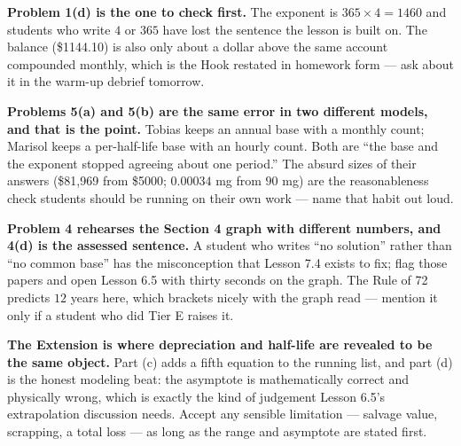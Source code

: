 \documentclass[10pt]{article}
\begin{document}
\begin{teachernote}
\textbf{Problem 1(d) is the one to check first.} The exponent is $365\times4=1460$ and students who
write $4$ or $365$ have lost the sentence the lesson is built on. The balance (\$1144.10) is also only
about a dollar above the same account compounded monthly, which is the Hook restated in homework form
--- ask about it in the warm-up debrief tomorrow.

\textbf{Problems 5(a) and 5(b) are the same error in two different models, and that is the point.}
Tobias keeps an annual base with a monthly count; Marisol keeps a per-half-life base with an hourly
count. Both are ``the base and the exponent stopped agreeing about one period.'' The absurd sizes of
their answers (\$81{,}969 from \$5000; $0.00034$ mg from $90$ mg) are the reasonableness check students
should be running on their own work --- name that habit out loud.

\textbf{Problem 4 rehearses the Section 4 graph with different numbers, and 4(d) is the assessed
sentence.} A student who writes ``no solution'' rather than ``no common base'' has the misconception
that Lesson 7.4 exists to fix; flag those papers and open Lesson 6.5 with thirty seconds on the graph.
The Rule of 72 predicts $12$ years here, which brackets nicely with the graph read --- mention it only
if a student who did Tier E raises it.

\textbf{The Extension is where depreciation and half-life are revealed to be the same object.} Part (c)
adds a fifth equation to the running list, and part (d) is the honest modeling beat: the asymptote is
mathematically correct and physically wrong, which is exactly the kind of judgement Lesson 6.5's
extrapolation discussion needs. Accept any sensible limitation --- salvage value, scrapping, a total
loss --- as long as the range and asymptote are stated first.
\end{teachernote}
\end{document}
